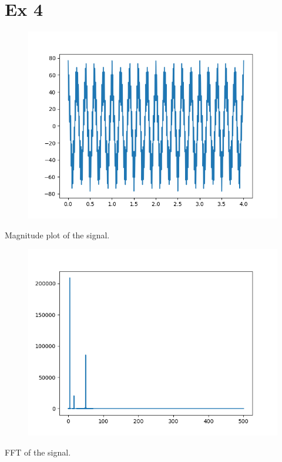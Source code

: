 \documentclass{article}
\begin{document}
\section*{Ex 4}
\begin{figure}[H]
    \includegraphics[width=\textwidth]{4a.png}
\end{figure}
Magnitude plot of the signal.
\begin{figure}[H]
    \includegraphics[width=\textwidth]{4b.png}
\end{figure}
FFT of the signal.
\end{document}
